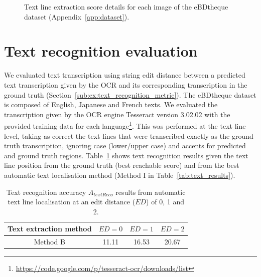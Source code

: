 \begin{figure}[!ht]
  \caption[Text line extraction score details for each image of the eBDtheque dataset]{Text line extraction score details for each image of the eBDtheque dataset (Appendix~\ref{app:dataset}).}
    \label{fig:ex:text_detection_result_details}
\end{figure}

\section{Text recognition evaluation} %
\label{par:ex:text_recognition_evaluation}

We evaluated text transcription using string edit distance between a predicted text transcription given by the OCR and its corresponding transcription in the ground truth (Section~\ref{sub:ex:text_recognition_metric}).
The eBDtheque dataset is composed of English, Japanese and French texts.
We evaluated the transcription given by the OCR engine Tesseract version 3.02.02 with the provided training data for each language\footnote{\url{https://code.google.com/p/tesseract-ocr/downloads/list}}.
This was performed at the text line level, taking as correct the text lines that were transcribed exactly as the ground truth transcription, ignoring case (lower/upper case) and accents for predicted and ground truth regions.
Table~\ref{tab:ex:text_recogniton_results} shows text recognition results given the text line position from the ground truth (best reachable score) and from the best automatic text localisation method (Method I in Table~\ref{tab:text_results}).

  \begin{table}[ht]
    \centering
    \caption{Text recognition accuracy $A_{textReco}$ results from automatic text line localisation at an edit distance ($ED$) of 0, 1 and 2.}
    \begin{tabular}{|c|c|c|c|}
          \hline
          Text extraction method &  $ED=0$  & $ED=1$  & $ED=2$  \\
          \hline
          Method B  &  11.11  & 16.53     & 20.67       \\
          \hline
        \end{tabular}
    \label{tab:ex:text_recogniton_results}
  \end{table}%

